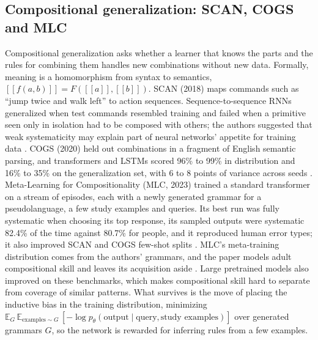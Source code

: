 \subsection{Compositional generalization: SCAN, COGS and MLC}
\label{sec:comp}
Compositional generalization asks whether a learner that knows the parts and the rules for combining them handles new combinations without new data. Formally, meaning is a homomorphism from syntax to semantics, $[\![f(a,b)]\!]=F([\![a]\!],[\![b]\!])$. SCAN (2018) maps commands such as ``jump twice and walk left'' to action sequences. Sequence-to-sequence RNNs generalized when test commands resembled training and failed when a primitive seen only in isolation had to be composed with others; the authors suggested that weak systematicity may explain part of neural networks' appetite for training data \cite{post63}. COGS (2020) held out combinations in a fragment of English semantic parsing, and transformers and LSTMs scored 96\% to 99\% in distribution and 16\% to 35\% on the generalization set, with 6 to 8 points of variance across seeds \cite{post64}. Meta-Learning for Compositionality (MLC, 2023) trained a standard transformer on a stream of episodes, each with a newly generated grammar for a pseudolanguage, a few study examples and queries. Its best run was fully systematic when choosing its top response, its sampled outputs were systematic 82.4\% of the time against 80.7\% for people, and it reproduced human error types; it also improved SCAN and COGS few-shot splits \cite{post65}. MLC's meta-training distribution comes from the authors' grammars, and the paper models adult compositional skill and leaves its acquisition aside \cite{post65}. Large pretrained models also improved on these benchmarks, which makes compositional skill hard to separate from coverage of similar patterns. What survives is the move of placing the inductive bias in the training distribution, minimizing $\mathbb{E}_{G}\,\mathbb{E}_{\text{examples}\sim G}\,[-\log p_\theta(\text{output}\mid\text{query},\text{study examples})]$ over generated grammars $G$, so the network is rewarded for inferring rules from a few examples.

